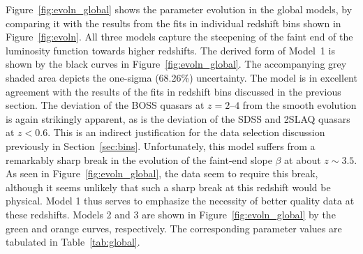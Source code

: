 \documentclass[fleqn,usenatbib]{mnras}
\begin{document}
Figure~\ref{fig:evoln_global} shows the parameter evolution in the
global models, by comparing it with the results from the fits in
individual redshift bins shown in Figure~\ref{fig:evoln}.  All three
models capture the steepening of the faint end of the luminosity
function towards higher redshifts.  The derived form of Model~1 is
shown by the black curves in Figure~\ref{fig:evoln_global}.  The
accompanying grey shaded area depicts the one-sigma (68.26\%)
uncertainty.  The model is in excellent agreement with the results of
the fits in redshift bins discussed in the previous section.
The deviation of the BOSS quasars at $z=2$--$4$ from the smooth
evolution is again strikingly apparent, as is the deviation of the
SDSS and 2SLAQ quasars at $z<0.6$.  This is an indirect justification
for the data selection discussion previously in
Section~\ref{sec:bins}.  Unfortunately, this model suffers from a
remarkably sharp break in the evolution of the faint-end slope $\beta$
at about $z\sim 3.5$.  As seen in Figure~\ref{fig:evoln_global}, the
data seem to require this break, although it seems unlikely that such
a sharp break at this redshift would be physical.  Model 1 thus serves
to emphasize the necessity of better quality data at these redshifts.
Models 2 and 3 are shown in Figure~\ref{fig:evoln_global} by the green
and orange curves, respectively.  The corresponding parameter values
are tabulated in Table~\ref{tab:global}.
\end{document}
